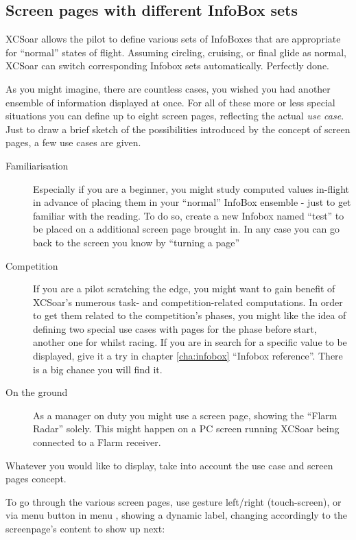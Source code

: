 \subsection*{Screen pages with different InfoBox sets}\label{sec:screenpages}

XCSoar allows the pilot to define various sets of InfoBoxes that are 
appropriate for ``normal'' states of flight.  Assuming circling,
cruising, or final glide as normal, XCSoar can switch corresponding Infobox 
sets automatically. Perfectly done.

As you might imagine, there are countless cases, you wished you had another 
ensemble of information displayed at once.  For all of these more or less 
special situations you can define up to eight screen pages, reflecting the 
actual \emph{use case}. Just to draw a brief sketch of the possibilities 
introduced by the concept of screen pages, a few use cases are given. 
\label{par:use_case}
\begin{description}
\item[Familiarisation] Especially if you are a beginner, you might study 
computed values in-flight in advance of placing them in your ``normal'' InfoBox
ensemble - just to get familiar with the reading. To do so, create a new 
Infobox named ``test'' to be placed on a additional screen page brought in. In
any case you can go back to the screen you know by ``turning a page''
\item[Competition] If you are a pilot scratching the edge, you might want to 
gain benefit of XCSoar's numerous task- and competition-related computations. 
In order to get them related to the competition's phases, you might like the 
idea of defining two special use cases with pages for the phase before start, 
another one for whilst racing.  If you are in search for a specific value to 
be displayed, give it a try in chapter \ref{cha:infobox} ``Infobox reference''.
There is a big chance you will find it.
\item[On the ground] As a manager on duty you might use a screen page, showing 
the ``Flarm Radar'' solely.  This might happen on a PC screen running XCSoar
being connected to a Flarm receiver.
\end{description}

Whatever you would like to display, take into account the use case and screen 
pages concept.

To go through the various screen pages, use gesture left/right (touch-screen), or via menu button in menu , showing a dynamic label, changing accordingly to the screenpage's content to show up next:

